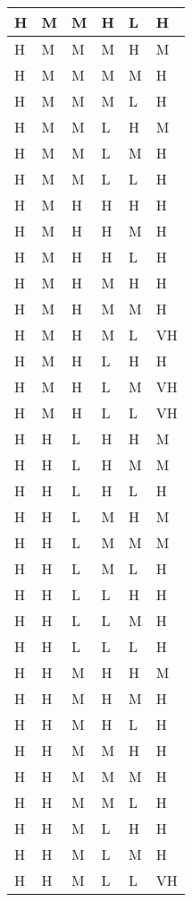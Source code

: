 \begin{center}
\begin{longtable}{| l | l | l | l | l | l |}
    H & M & M & H & L & H \\ \hline 
    H & M & M & M & H & M \\ \hline 
    H & M & M & M & M & H \\ \hline 
    H & M & M & M & L & H \\ \hline 
    H & M & M & L & H & M \\ \hline 
    H & M & M & L & M & H \\ \hline 
    H & M & M & L & L & H \\ \hline 
    H & M & H & H & H & H \\ \hline 
    H & M & H & H & M & H \\ \hline 
    H & M & H & H & L & H \\ \hline 
    H & M & H & M & H & H \\ \hline 
    H & M & H & M & M & H \\ \hline 
    H & M & H & M & L & VH \\ \hline 
    H & M & H & L & H & H \\ \hline 
    H & M & H & L & M & VH \\ \hline 
    H & M & H & L & L & VH \\ \hline 
    H & H & L & H & H & M \\ \hline 
    H & H & L & H & M & M \\ \hline 
    H & H & L & H & L & H \\ \hline 
    H & H & L & M & H & M \\ \hline 
    H & H & L & M & M & M \\ \hline 
    H & H & L & M & L & H \\ \hline 
    H & H & L & L & H & H \\ \hline 
    H & H & L & L & M & H \\ \hline 
    H & H & L & L & L & H \\ \hline 
    H & H & M & H & H & M \\ \hline 
    H & H & M & H & M & H \\ \hline 
    H & H & M & H & L & H \\ \hline 
    H & H & M & M & H & H \\ \hline 
    H & H & M & M & M & H \\ \hline 
    H & H & M & M & L & H \\ \hline 
    H & H & M & L & H & H \\ \hline 
    H & H & M & L & M & H \\ \hline 
    H & H & M & L & L & VH \\ \hline 

\end{longtable}
\end{center}
